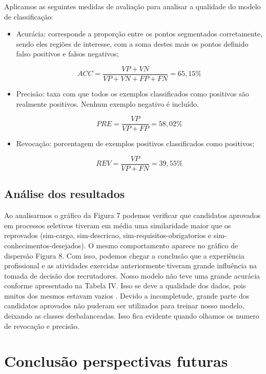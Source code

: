 \documentclass[conference]{IEEEtran}
\begin{document}
Aplicamos as seguintes medidas  de avaliação para analisar a qualidade do modelo de classificação:
\begin{itemize}
\item Acurácia: corresponde a proporção entre os pontos segmentados corretamente, sendo eles regiões de interesse, com a soma destes mais os pontos definido falso positivos e falsos negativos;

     \[ACC = \frac{VP + VN}{VP+VN+FP+FN} = 65,15\%\]

\item Precisão: taxa com que todos os exemplos classificados como positivos são realmente positivos. Nenhum exemplo negativo é incluído.

    \[PRE = \frac{VP}{VP+FP} = 58,02\%\]

\item  Revocação: porcentagem de exemplos positivos classificados como positivos;

    \[REV = \frac{VP}{VP+FN} = 39,55\%\]
\end{itemize}

    
    \subsection{Análise dos resultados}

	 Ao analisarmos o gráfico da Figura 7 podemos verificar que candidatos aprovados em processos seletivos tiveram em média uma similaridade maior que os reprovados (sim-cargo, sim-descricao, sim-requisitos-obrigatorios e sim-conhecimentos-desejados). 
     O mesmo comportamento aparece no gráfico de dispersão Figura 8. Com isso, podemos chegar a conclusão que a experiência profissional e as atividades exercidas anteriormente tiveram grande influência na tomada de decisão dos recrutadores.
     Nosso modelo não teve uma grande acurácia conforme apresentado na Tabela IV. Isso se deve a qualidade dos dados, pois muitos dos mesmos estavam vazios . Devido a incompletude, grande parte dos candidatos aprovados não puderam ser utilizados para treinar nosso modelo, deixando as classes desbalanceadas. Isso fica evidente quando olhamos os numero de revocação e precisão.
	   
\section*{Conclusão perspectivas futuras}
\end{document}
